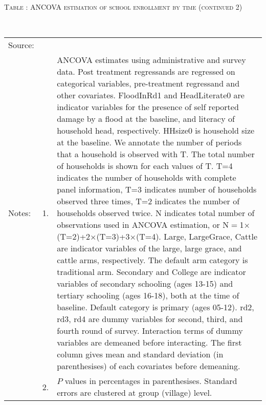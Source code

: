 \hspace{-1cm}\begin{minipage}[t]{14cm}
\hfil\textsc{\normalsize Table \thetable: ANCOVA estimation of school enrollment by time (continued 2)\label{tab ANCOVA enroll time varying3}}\\
\setlength{\tabcolsep}{1pt}
\setlength{\baselineskip}{8pt}
\renewcommand{\arraystretch}{.525}
\hfil{}\\
\renewcommand{\arraystretch}{.8}
\setlength{\tabcolsep}{1pt}
\hspace{-1cm}\begin{tabular}{>{\hfill\scriptsize}p{1cm}<{}>{\hfill\scriptsize}p{.25cm}<{}>{\scriptsize}p{14cm}<{\hfill}}
Source:& \multicolumn{2}{l}{\scriptsize Estimated with GUK administrative and survey data.}\\
Notes: & 1. & ANCOVA estimates using administrative and survey data. Post treatment regressands are regressed on categorical variables, pre-treatment regressand and other covariates. \textsf{FloodInRd1} and \textsf{HeadLiterate0} are indicator variables for the presence of self reported damage by a flood at the baseline, and literacy of household head, respectively. \textsf{HHsize0} is household size at the baseline. We annotate the number of periods that a household is observed with \textsf{T}. The total number of households is shown for each values of \textsf{T}. \textsf{T=4} indicates the number of households with complete panel information, \textsf{T=3} indicates number of households observed three times, \textsf{T=2} indicates the number of households observed twice. \textsf{N} indicates total number of observations used in ANCOVA estimation, or \textsf{N$=$1$\times$(T=2)+2$\times$(T=3)+3$\times$(T=4)}.  \textsf{Large}, \textsf{LargeGrace}, \textsf{Cattle} are indicator variables of the \textsf{large}, \textsf{large grace}, and \textsf{cattle} arms, respectively. The default arm category is \textsf{traditional} arm. \textsf{Secondary} and \textsf{College} are indicator variables of secondary schooling (ages 13-15) and tertiary schooling (ages 16-18), both at the time of baseline. Default category is primary (ages 05-12). \textsf{rd2, rd3, rd4} are dummy variables for second, third, and fourth round of survey. Interaction terms of dummy variables are demeaned before interacting. The first column gives mean and standard deviation (in parenthesises) of each covariates before demeaning.\\
& 2. & $P$ values in percentages in parenthesises. Standard errors are clustered at group (village) level.%
\end{tabular}
\end{minipage}

